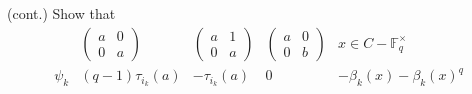 \documentclass[../Odyssey_Project.tex]{subfiles}
\begin{document}
\begin{exercise}
\label{ex:16.18}
(cont.) Show that
\[
\begin{array}{c|cccc}
 & \begin{pmatrix} a & 0 \\ 0 & a \end{pmatrix} & \begin{pmatrix} a & 1 \\ 0 & a \end{pmatrix} & \begin{pmatrix} a & 0 \\ 0 & b \end{pmatrix} & x \in C - \mathbb{F}_q^\times \\
\hline
\psi_k & (q - 1) \tau_{i_k}(a) & -\tau_{i_k}(a) & 0 & -\beta_k(x) - \beta_k(x)^q
\end{array}
\]
\end{exercise}
\end{document}
